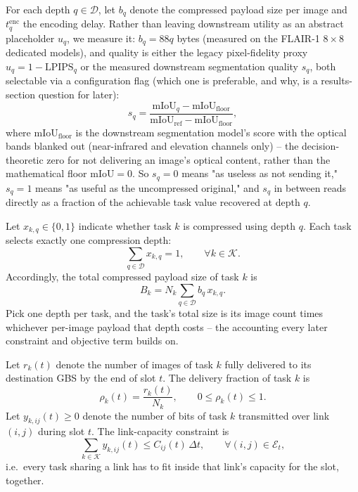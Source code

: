 For each depth $q \in \mathcal{D}$, let $b_q$ denote the compressed payload size per image and $t_q^{\mathrm{enc}}$ the encoding delay. Rather than leaving downstream utility as an abstract placeholder $u_q$, we measure it: $b_q = 88q$ bytes (measured on the FLAIR-1 $8{\times}8$ dedicated models), and quality is either the legacy pixel-fidelity proxy $u_q = 1 - \mathrm{LPIPS}_q$ or the measured downstream segmentation quality $s_q$, both selectable via a configuration flag (which one is preferable, and why, is a results-section question for later):
\begin{equation}
s_q = \frac{\mathrm{mIoU}_q - \mathrm{mIoU}_{\mathrm{floor}}}
           {\mathrm{mIoU}_{\mathrm{ref}} - \mathrm{mIoU}_{\mathrm{floor}}},
\end{equation}
where $\mathrm{mIoU}_{\mathrm{floor}}$ is the downstream segmentation model's score with the optical bands blanked out (near-infrared and elevation channels only) -- the decision-theoretic zero for not delivering an image's optical content, rather than the mathematical floor $\mathrm{mIoU} = 0$. So $s_q = 0$ means "as useless as not sending it," $s_q = 1$ means "as useful as the uncompressed original," and $s_q$ in between reads directly as a fraction of the achievable task value recovered at depth $q$.

Let $x_{k,q} \in \{0,1\}$ indicate whether task $k$ is compressed using depth $q$. Each task selects exactly one compression depth:
\begin{equation}
\sum_{q \in \mathcal{D}} x_{k,q} = 1, \qquad \forall k \in \mathcal{K}.
\end{equation}
Accordingly, the total compressed payload size of task $k$ is
\begin{equation}
B_k = N_k \sum_{q \in \mathcal{D}} b_q\, x_{k,q}.
\end{equation}
Pick one depth per task, and the task's total size is its image count times whichever per-image payload that depth costs -- the accounting every later constraint and objective term builds on.

Let $r_k(t)$ denote the number of images of task $k$ fully delivered to its destination GBS by the end of slot $t$. The delivery fraction of task $k$ is
\begin{equation}
\rho_k(t) = \frac{r_k(t)}{N_k}, \qquad 0 \le \rho_k(t) \le 1.
\end{equation}
Let $y_{k,ij}(t) \ge 0$ denote the number of bits of task $k$ transmitted over link $(i,j)$ during slot $t$. The link-capacity constraint is
\begin{equation}
\sum_{k \in \mathcal{K}} y_{k,ij}(t) \le C_{ij}(t)\, \Delta t,
\qquad \forall (i,j) \in \mathcal{E}_t,
\end{equation}
i.e.\ every task sharing a link has to fit inside that link's capacity for the slot, together.

